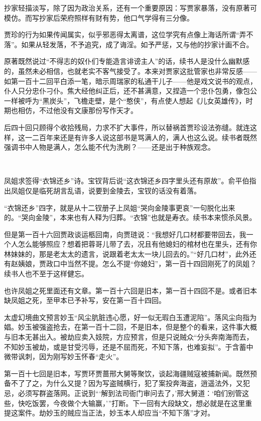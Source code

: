 \par 抄家轻描淡写，除了因为政治关系，还有一个重要原因：写贾家暴落，没有原著可模仿。而写抄家后荣府照样有财有势，他口气学得有三分像。
\par 贾珍的行为如果传闻属实，似乎邪恶得太离谱，这位学究有点像上海话所谓“弄不落”。如果从轻发落，不予追究，成了诲淫。如予严惩，又与他的抄家计画不合。
\par 原著既然说过“不得志的奴仆们专能造言诽谤主人”的话，续书人是没什么幽默感的，虽然未必相信，也就老实不客气接受了。本来对贾家这批管家也非常反感——如第一百十二回平白添一笔，暗示周瑞家的私通干儿子——他是戏文说书的观点，仆人只分忠仆刁仆。焦大经他纠正后，还不甚满意，又捏造一个忠仆包勇，像包公一样被呼为“黑炭头”，飞檐走壁，是个“憨侠”，有点使人想起《儿女英雄传》，时期也相仿，不过他没有文康那份写作天才。
\par 后四十回只顾得个收拾残局，力求不扩大事件，所以替祸首贾珍设法弥缝。就连这样，这一二百年来还是有许多人说这部书是骂满人的，满人也这么说。续书者既然强调书中人物是满人，怎么能不代为洗刷？——还是出于种族观念。
\par  
\par 凤姐求签得“衣锦还乡”诗。宝钗背后说“这衣锦还乡四字里头还有原故”。俞平伯指出凤姐仅是临死胡言乱语，说要到金陵去，宝钗的话没有着落。
\par “衣锦还乡”四字，就是从十二钗册子上凤姐“哭向金陵事更哀”一句脱化出来的。“哭向金陵”，本来也有人释为归葬。“衣锦”也就是寿衣。续书本来惯杀风景。
\par 但是第一百十六回贾政谈运柩回南，向贾琏说：“我想好几口材都要带回去，我一个人怎么能够照应？想着把蓉哥儿带了去，况且有他媳妇的棺材也在里头，还有你林妹妹的，那是老太太的遗言，说跟着老太太一块儿回去的。”“好几口材”，此外还有赵姨娘，贾政口中当然不提。怎么不提“你媳妇”，第一百十四回刚死了的凤姐？续书人也不至于这样健忘。
\par 也许凤姐之死里面还有文章。第一百十六回是旧本，第一百十四回不是。或者旧本缺凤姐之死，至甲本已予补写，安在第一百十四回。
\par 太虚幻境曲文预言妙玉“风尘肮脏违心愿，好一似无瑕白玉遭泥陷”。落风尘向指为娼。妙玉被强盗抢去，在第一百十二回，不是旧本，但是整个的看来，这件事大概与旧本无甚出入。被劫应卖入妓院，方应预言，但是只说贼众“分头奔南海而去，不知妙玉被劫，或是甘受污辱，还是不屈而死，不知下落，也难妄拟”。于含蓄中微带讽刺，因为刚写妙玉怀春“走火”。
\par 第一百十七回是旧本，写贾环贾蔷邢大舅等聚饮，谈起海疆贼寇被捕新闻。既然预备不了了之，为什么又提？因为写盗贼横行，犯了案投奔海盗，逍遥法外，又犯忌，必须写群盗落网。正说到“‘解到法司衙门审问去了，’邢大舅道：‘咱们别管这些，快吃饭罢，今夜做个大输赢，'”打断。下一回有大段缺文，想必就是在这里重提这案件。劫妙玉的贼应当正法，妙玉本人却应当“不知下落”才对。
